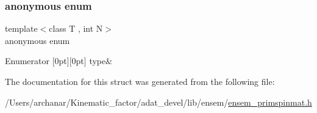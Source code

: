 \subsubsection{\texorpdfstring{anonymous enum}{anonymous enum}}
{\footnotesize\ttfamily template$<$class T , int N$>$ \\
anonymous enum}

\begin{DoxyEnumFields}{Enumerator}
[0pt][0pt]{}\mbox{\label{structENSEM_1_1EnsbcIO_3_01PSpinMatrix_3_01T_00_01N_01_4_01_4_ac4138d959d9dfe07b7e4b78aa7cc52dcaf077b5478aa428f9a9b3c64cb72e8a8c}} 
type&\\
\hline

\end{DoxyEnumFields}


The documentation for this struct was generated from the following file\+:\begin{DoxyCompactItemize}
\item 
/\+Users/archanar/\+Kinematic\+\_\+factor/adat\+\_\+devel/lib/ensem/\mbox{\hyperlink{lib_2ensem_2ensem__primspinmat_8h}{ensem\+\_\+primspinmat.\+h}}\end{DoxyCompactItemize}
